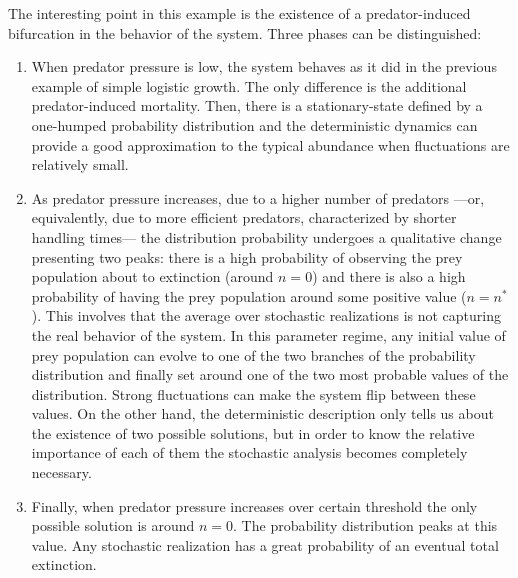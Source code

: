 The interesting point in this example is the existence of a predator-induced bifurcation in the behavior of the system. Three phases can be distinguished:
\begin{enumerate}
\item When predator pressure is low, the system behaves as it did in the previous example of simple logistic growth. The only difference is the additional predator-induced mortality. Then, there is a stationary-state defined by a one-humped probability distribution and the deterministic dynamics can provide a good approximation to the typical abundance when fluctuations are relatively small. 
\item As predator pressure increases, due to a higher number of predators ---or, equivalently, due to more efficient predators, characterized by shorter handling times--- the distribution probability undergoes a qualitative change presenting two peaks: there is a high probability of observing the prey population about to extinction (around $n=0$) and there is also a high probability of having the prey population around some positive value ($n=n^{*}$). This involves that the average over stochastic realizations is not capturing the real behavior of the system. In this parameter regime, any initial value of prey population can evolve to one of the two branches of the probability distribution and finally set around one of the two most probable values of the distribution. Strong fluctuations can make the system flip between these values. On the other hand, the deterministic description only tells us about the existence of two possible solutions, but in order to know the relative importance of each of them the stochastic analysis becomes completely necessary.  
\item Finally, when predator pressure increases over certain threshold the only possible solution is around $n=0$. The probability distribution peaks at this value. Any stochastic realization has a great probability of an eventual total extinction.
\end{enumerate}
\smallskip 

